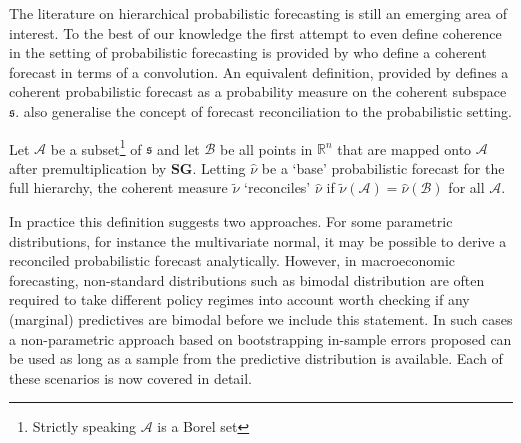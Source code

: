 \documentclass[graybox]{svmult}
\begin{document}

The literature on hierarchical probabilistic forecasting is still an emerging area of interest. %
To the best of our knowledge the first attempt to even define coherence in the setting of probabilistic forecasting is provided by \cite{Taieb2017} who define a coherent forecast in terms of a convolution.  An equivalent definition, provided by \cite{Gamakumara2018} defines a  coherent probabilistic forecast as a probability measure on the coherent subspace $\mathfrak{s}$.  \cite{Gamakumara2018} also generalise the concept of forecast reconciliation to the probabilistic setting.  

\begin{definition} Let $\mathcal{A}$ be a subset\footnote{Strictly speaking $\mathcal{A}$ is a Borel set} of $\mathfrak{s}$ and let $\mathcal{B}$ be all points in $\mathbb{R}^n$ that are mapped onto  $\mathcal{A}$ after premultiplication by $\bm{S}\bm{G}$. Letting $\hat{\nu}$ be a `base' probabilistic forecast for the full hierarchy, the coherent measure $\tilde{\nu}$ `reconciles' $\hat{\nu}$ if $\tilde{\nu}(\mathcal{A})=\hat{\nu}(\mathcal{B})$ for all $\mathcal{A}$.
\end{definition}

In practice this definition suggests two approaches.  For some parametric distributions, for instance the multivariate normal, it may be possible to derive a reconciled probabilistic forecast analytically.  However, in macroeconomic forecasting, non-standard distributions such as bimodal distribution are often required to take different policy regimes into account {\color{red} worth checking if any (marginal) predictives are bimodal before we include this statement}.  In such cases a non-parametric approach based on bootstrapping in-sample errors proposed \cite{Gamakumara2018} can be used as long as a sample from the predictive distribution is available.  Each of these scenarios is now covered in detail.
\end{document}
